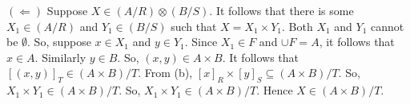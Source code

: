 \documentclass{article}
\begin{document}
$(\Leftarrow)$ Suppose $X \in (A/R) \otimes (B/S)$. It follows that
there is some $X_1 \in (A/R)$ and $Y_1 \in (B/S)$ such that $X=X_1
\times Y_1$. Both $X_1$ and $Y_1$ cannot be $\emptyset$. So, suppose
$x \in X_1$ and $y \in Y_1$. Since $X_1 \in F$ and $\cup F = A$, it
follows that $x \in A$. Similarly $y \in B$. So, $(x,y) \in A \times
B$. It follows that $[(x,y)]_T \in (A \times B)/T$. From (b), $[x]_R
\times [y]_S \subseteq (A \times B)/T$. So, $X_1 \times Y_1 \in (A
\times B)/T$. So, $X_1 \times Y_1 \in (A \times B)/T$. Hence $X \in (A
\times B)/T$.
\end{document}
